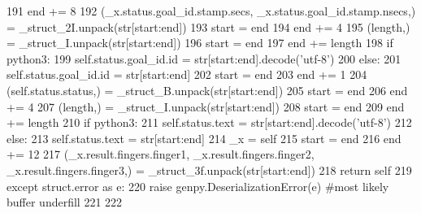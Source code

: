 \begin{DoxyCode}
191       end += 8
192       (\_x.status.goal\_id.stamp.secs, \_x.status.goal\_id.stamp.nsecs,) = \_struct\_2I.unpack(str[start:end])
193       start = end
194       end += 4
195       (length,) = \_struct\_I.unpack(str[start:end])
196       start = end
197       end += length
198       \textcolor{keywordflow}{if} python3:
199         self.status.goal\_id.id = str[start:end].decode(\textcolor{stringliteral}{'utf-8'})
200       \textcolor{keywordflow}{else}:
201         self.status.goal\_id.id = str[start:end]
202       start = end
203       end += 1
204       (self.status.status,) = \_struct\_B.unpack(str[start:end])
205       start = end
206       end += 4
207       (length,) = \_struct\_I.unpack(str[start:end])
208       start = end
209       end += length
210       \textcolor{keywordflow}{if} python3:
211         self.status.text = str[start:end].decode(\textcolor{stringliteral}{'utf-8'})
212       \textcolor{keywordflow}{else}:
213         self.status.text = str[start:end]
214       \_x = self
215       start = end
216       end += 12
217       (\_x.result.fingers.finger1, \_x.result.fingers.finger2, \_x.result.fingers.finger3,) = 
      \_struct\_3f.unpack(str[start:end])
218       \textcolor{keywordflow}{return} self
219     \textcolor{keywordflow}{except} struct.error \textcolor{keyword}{as} e:
220       \textcolor{keywordflow}{raise} genpy.DeserializationError(e) \textcolor{comment}{#most likely buffer underfill}
221 
222 
\end{DoxyCode}
